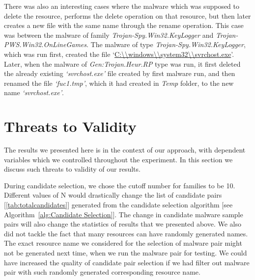 There was also an interesting cases where the malware which was supposed to delete the resource, performs the delete operation on that resource, but then later creates a new file with the same name through the rename operation.
This case was between the malware of family \emph{Trojan-Spy.Win32.KeyLogger} and \emph{Trojan-PWS.Win32.OnLineGames}.
The malware of type \emph{Trojan-Spy.Win32.KeyLogger}, which was run first, created the file `\url{C:\\windows\\system32\\svrchost.exe}'. %
Later, when the malware of \emph{Gen:Trojan.Heur.RP} type was run, it first deleted the already existing \emph{`svrchost.exe'} file created by first malware run, and then renamed the file \emph{`fuc1.tmp'}, which it had created in \emph{Temp} folder, to the new name \emph{`svrchost.exe'}.\\

\section{Threats to Validity}
\label{sec:Threats to Validity}
The results we presented here is in the context of our approach, with dependent variables which we controlled throughout the experiment.
In this section we discuss such threats to validity of our results.

During candidate selection, we chose the cutoff number for families to be 10.
Different values of N would drastically change the list of candidate pairs [\autoref{tab:totalcandidates}] generated from the candidate selection algorithm [see Algorithm~\autoref{alg:Candidate Selection}].
The change in candidate malware sample pairs will also change the statistics of results that we presented above.
We also did not tackle the fact that many resources can have randomly generated names.
The exact resource name we considered for the selection of malware pair might not be generated next time, when we run the malware pair for testing.
We could have increased the quality of candidate pair selection if we had filter out malware pair with such randomly generated corresponding resource name.

